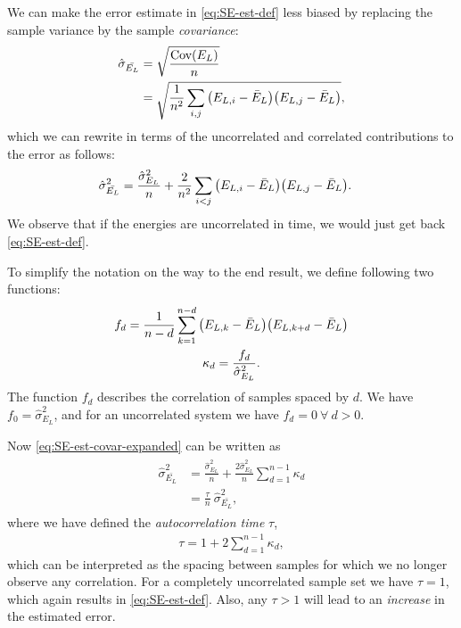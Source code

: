 \documentclass[twocolumn]{article}
\begin{document}
We can make the error estimate in \eqref{eq:SE-est-def} less biased by replacing
the sample variance by the sample \textit{covariance}:
\begin{align}
    \begin{split}
        \hat{\sigma}_{\bar{ E_L}} &= \sqrt{\frac{\text{Cov}(E_L)}{n}}\\
        &= \sqrt{\frac{1}{n^2}\sum_{i,j}\qty(E_{L,i} - \bar{E}_L)\qty(E_{L,j}-\bar{E}_L)},
    \end{split}
    \label{eq:SE-est-covar-def}
\end{align}
which we can rewrite in terms of the uncorrelated and correlated contributions
to the error as follows:
\begin{align}
    \begin{split}
    \hat{\sigma}^2_{\bar{E_L}} &=
        \frac{\hat{\sigma}^2_{E_L}}{n}
    + \frac{2}{n^2}\sum_{i<j}\qty(E_{L,i} - \bar{E}_L)\qty(E_{L,j}-\bar{E}_L).
    \end{split}\label{eq:SE-est-covar-expanded}
\end{align}
We observe that if the energies are uncorrelated in time, we would just get back
\eqref{eq:SE-est-def}.

To simplify the notation on the way to the end result, we define following two 
functions:
\begin{gather}
    f_d = \frac{1}{n-d}\sum_{k=1}^{n-d} \qty(E_{L,k} -
    \bar{E}_L)\qty(E_{L,k+d}-\bar{E}_L)\\
    \kappa_d = \frac{f_d}{\hat{\sigma}^2_{E_L}}.
\end{gather}
The function $f_d$ describes the correlation of samples spaced by $d$. We have
$f_0=\hat{\sigma}_{E_L}^2$, and for an uncorrelated system we have $f_d=0\
\forall\ d>0$.

Now \eqref{eq:SE-est-covar-expanded} can be written as
\begin{align}
    \begin{split}
    \hat{\sigma}^2_{\bar{E_L}} &= \frac{\hat{\sigma}^2_{E_L}}{n} +
    \frac{2\hat{\sigma}^2_{E_L}}{n}\sum_{d=1}^{n-1}\kappa_d\\
    &= \frac{\tau}{n}\ \hat{\sigma}^2_{\bar{E_L}},
    \end{split}
\end{align}
where we have defined the \textit{autocorrelation time} $\tau$, 
\begin{align}
    \tau = 1 + 2\sum_{d=1}^{n-1}\kappa_d,\label{eq:autocorr-time-def}
\end{align}
which can be interpreted as the spacing between samples for which we no longer
observe any correlation. For a completely uncorrelated sample set we have $\tau
=1$, which again results in \eqref{eq:SE-est-def}. Also, any $\tau>1$ will lead
to an \textit{increase} in the estimated error.
\end{document}
